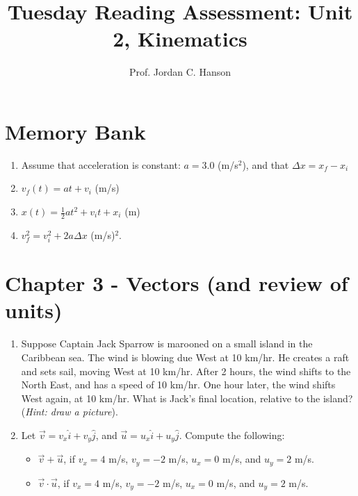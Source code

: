 \documentclass{article}
\begin{document}
\title{Tuesday Reading Assessment: Unit 2, Kinematics}
\author{Prof. Jordan C. Hanson}

\maketitle

\section{Memory Bank}

\begin{enumerate}
\item Assume that acceleration is constant: $a = 3.0$ (m/s$^2$), and that $\Delta x = x_f - x_i$
\item $v_f(t) = at + v_{i}$ (m/s)
\item $x(t) = \frac{1}{2}at^2 + v_{i} t + x_{i}$ (m)
\item $v_f^2 = v_i^2 + 2a\Delta x$ (m/s)$^2$.
\end{enumerate}

\section{Chapter 3 - Vectors (and review of units)}

\begin{enumerate}
\item Suppose Captain Jack Sparrow is marooned on a small island in the Caribbean sea.  The wind is blowing due West at 10 km/hr.  He creates a raft and sets sail, moving West at 10 km/hr.  After 2 hours, the wind shifts to the North East, and has a speed of 10 km/hr.  One hour later, the wind shifts West again, at 10 km/hr.  What is Jack's final location, relative to the island? (\textit{Hint: draw a picture}). \\ \vspace{3cm}
\item Let $\vec{v} = v_x \hat{i} + v_y \hat{j}$, and $\vec{u} = u_x \hat{i} + u_y \hat{j}$.  Compute the following:
\begin{itemize}
\item $\vec{v} + \vec{u}$, if $v_x = 4$ m/s, $v_y = -2$ m/s, $u_x = 0$ m/s, and $u_y = 2$ m/s.
\item $\vec{v} \cdot \vec{u}$, if $v_x = 4$ m/s, $v_y = -2$ m/s, $u_x = 0$ m/s, and $u_y = 2$ m/s.
\end{itemize}
\end{enumerate}
\end{document}
